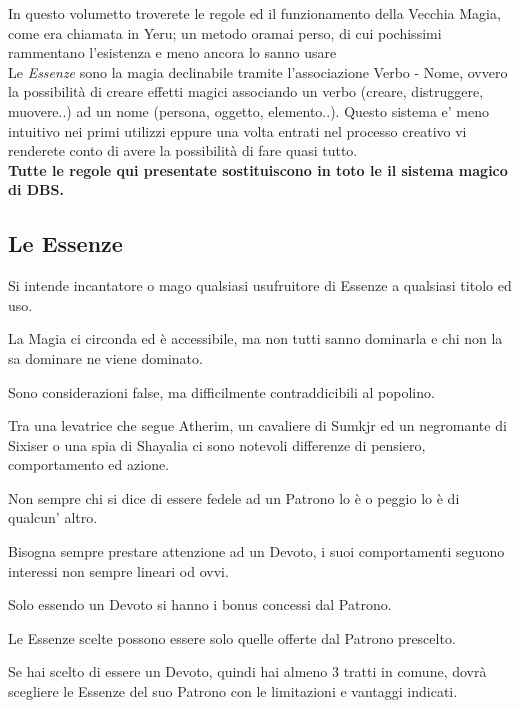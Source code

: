 \documentclass[a4paper,10 pt,twoside,openany]{book}
\begin{document}
\begin{note}
	In questo volumetto troverete le regole ed il funzionamento della Vecchia Magia, come era chiamata in Yeru; un metodo oramai perso, di cui pochissimi rammentano l'esistenza e meno ancora lo sanno usare\\

	Le \textit{Essenze} sono la magia declinabile tramite l'associazione Verbo - Nome, ovvero la possibilità di creare effetti magici associando un verbo (creare, distruggere, muovere..) ad un nome (persona, oggetto, elemento..). Questo sistema e' meno intuitivo nei primi utilizzi eppure una volta entrati nel processo creativo vi renderete conto di avere la possibilità di fare quasi tutto.\\

	\textbf{Tutte le regole qui presentate sostituiscono in toto le il sistema magico di DBS.}

\end{note}

\subsection{Le Essenze}

Si intende incantatore o mago qualsiasi usufruitore di Essenze a qualsiasi titolo ed uso.

La Magia ci circonda ed è accessibile, ma non tutti sanno dominarla e chi non la sa dominare ne viene dominato.

Sono considerazioni false, ma difficilmente contraddicibili al popolino.

Tra una levatrice che segue Atherim, un cavaliere di Sumkjr ed un negromante di Sixiser o una spia di Shayalia ci sono notevoli differenze di pensiero, comportamento ed azione.

Non sempre chi si dice di essere fedele ad un Patrono lo è o peggio lo è di qualcun' altro.

Bisogna sempre prestare attenzione ad un Devoto, i suoi comportamenti seguono interessi non sempre lineari od ovvi.

Solo essendo un Devoto si hanno i bonus concessi dal Patrono. 

Le Essenze scelte possono essere solo quelle offerte dal Patrono prescelto.

Se hai scelto di essere un Devoto, quindi hai almeno 3 tratti in comune, dovrà scegliere le Essenze del suo Patrono con le limitazioni e vantaggi indicati.
\end{document}
